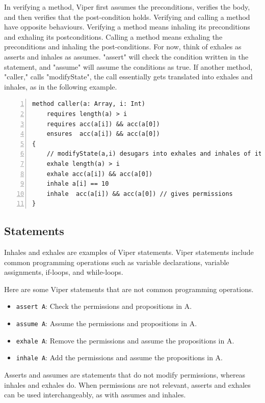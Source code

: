 \documentclass[msc,oneside]{ubcthesis}
\begin{document}
In verifying a method, Viper first assumes the preconditions, verifies the body, and then verifies that the post-condition holds. Verifying and calling a method have opposite behaviours. Verifying a method means inhaling its preconditions and exhaling its postconditions. Calling a method means exhaling the preconditions and inhaling the post-conditions. For now, think of exhales as asserts and inhales as assumes. "assert" will check the condition written in the statement, and "assume" will assume the conditions as true. If another method, "caller," calls "modifyState", the call essentially gets translated into exhales and inhales, as in the following example.
\begin{lstlisting}[language=silver,numbers=left, firstnumber=1, stepnumber=1]
method caller(a: Array, i: Int)
    requires length(a) > i
    requires acc(a[i]) && acc(a[0])
    ensures  acc(a[i]) && acc(a[0])
{
    // modifyState(a,i) desugars into exhales and inhales of its specifications.
    exhale length(a) > i
    exhale acc(a[i]) && acc(a[0])
    inhale a[i] == 10
    inhale  acc(a[i]) && acc(a[0]) // gives permissions
}
\end{lstlisting}

\subsection{Statements}
Inhales and exhales are examples of Viper statements. Viper statements include common programming operations such as variable declarations, variable assignments, if-loops, and while-loops. 

Here are some Viper statements that are not common programming operations.
\begin{itemize}
    \item \lstinline{assert A}: Check the permissions and propositions in A.
    \item \lstinline{assume A}: Assume the permissions and propositions in A.
    \item \lstinline{exhale A}: Remove the permissions and assume the propositions in A. 
    \item \lstinline{inhale A}: Add the permissions and assume the propositions in A.
\end{itemize}

Asserts and assumes are statements that do not modify permissions, whereas inhales and exhales do. When permissions are not relevant, asserts and exhales can be used interchangeably, as with assumes and inhales. 
\end{document}
